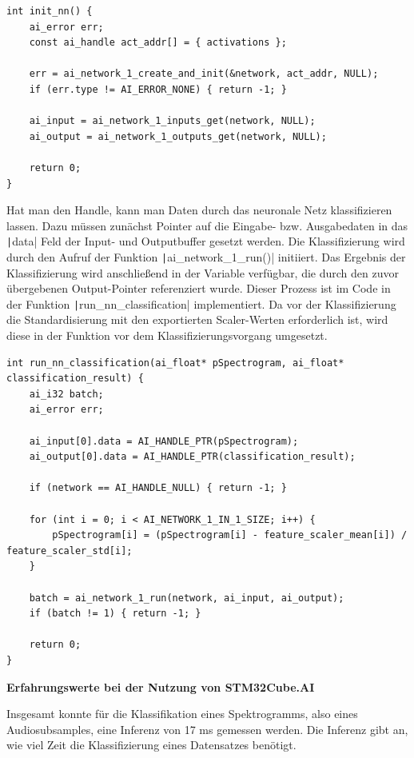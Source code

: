 \begin{verbatim}
int init_nn() {
	ai_error err;
	const ai_handle act_addr[] = { activations };

	err = ai_network_1_create_and_init(&network, act_addr, NULL);
	if (err.type != AI_ERROR_NONE) { return -1; }
	
	ai_input = ai_network_1_inputs_get(network, NULL);
	ai_output = ai_network_1_outputs_get(network, NULL);

	return 0;
}
\end{verbatim}

Hat man den Handle, kann man Daten durch das neuronale Netz klassifizieren lassen. Dazu müssen zunächst Pointer auf die Eingabe- bzw. Ausgabedaten in das \texttt|data| Feld der Input- und Outputbuffer gesetzt werden. Die Klassifizierung wird durch den Aufruf der Funktion \texttt|ai_network_1_run()| initiiert. Das Ergebnis der Klassifizierung wird anschließend in der Variable verfügbar, die durch den zuvor übergebenen Output-Pointer referenziert wurde. Dieser Prozess ist im Code in der Funktion \texttt|run_nn_classification| implementiert. Da vor der Klassifizierung die Standardisierung mit den exportierten Scaler-Werten erforderlich ist, wird diese in der Funktion vor dem Klassifizierungsvorgang umgesetzt.

\begin{verbatim}
int run_nn_classification(ai_float* pSpectrogram, ai_float* classification_result) {
    ai_i32 batch;
    ai_error err;

    ai_input[0].data = AI_HANDLE_PTR(pSpectrogram);
    ai_output[0].data = AI_HANDLE_PTR(classification_result);

    if (network == AI_HANDLE_NULL) { return -1; }

    for (int i = 0; i < AI_NETWORK_1_IN_1_SIZE; i++) {
    	pSpectrogram[i] = (pSpectrogram[i] - feature_scaler_mean[i]) / feature_scaler_std[i];
    }

    batch = ai_network_1_run(network, ai_input, ai_output);
    if (batch != 1) { return -1; }

    return 0;
}
\end{verbatim}

\textbf{Erfahrungswerte bei der Nutzung von STM32Cube.AI}

Insgesamt konnte für die Klassifikation eines Spektrogramms, also eines Audiosubsamples, eine Inferenz von 17 ms gemessen werden. Die Inferenz gibt an, wie viel Zeit die Klassifizierung eines Datensatzes benötigt.

